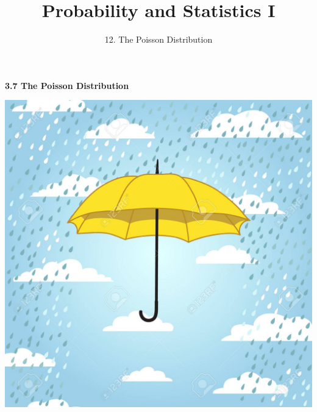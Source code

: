 

\newcommand{\lecturenum}{12}

\title[SS2857]{Probability and Statistics I}
\subtitle{\lecturenum. The Poisson Distribution}

\date{}






{

\begin{frame}
  \addtocounter{framenumber}{-1}

  \maketitle
\end{frame}
}

\begin{frame}
  \frametitle{}

  \begin{center}
    
    \Large{\textbf{3.7 The Poisson Distribution}}
  \end{center}
  
  
  \begin{center}
    \includegraphics[height=.5\textheight]{figure/umbrella}
  \end{center}



\end{frame}

